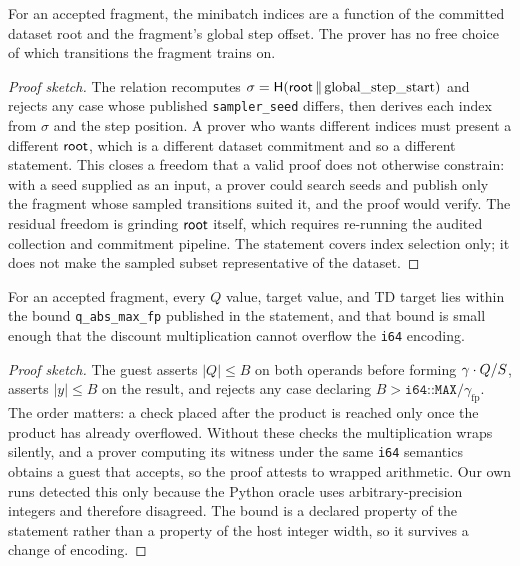 \begin{theorem}
\label{thm:sampler-binding}
For an accepted fragment, the minibatch indices are a function of the committed
dataset root and the fragment's global step offset. The prover has no free
choice of which transitions the fragment trains on.
\end{theorem}
\begin{proof}[Proof sketch]
The relation recomputes
$\sigma = \mathsf{H}(\mathsf{root} \,\|\, \mathrm{global\_step\_start})$ and rejects any
case whose published \texttt{sampler\_seed} differs, then derives each index
from $\sigma$ and the step position.  A prover who wants different indices must
present a different $\mathsf{root}$, which is a different dataset commitment and so a
different statement.  This closes a freedom that a valid proof does not
otherwise constrain: with a seed supplied as an input, a prover could search
seeds and publish only the fragment whose sampled transitions suited it, and
the proof would verify.  The residual freedom is grinding $\mathsf{root}$ itself, which
requires re-running the audited collection and commitment pipeline.  The
statement covers index selection only; it does not make the sampled subset
representative of the dataset.
\end{proof}

\begin{theorem}
\label{thm:value-bound}
For an accepted fragment, every $Q$ value, target value, and TD target lies
within the bound \texttt{q\_abs\_max\_fp} published in the statement, and that
bound is small enough that the discount multiplication cannot overflow the
\texttt{i64} encoding.
\end{theorem}
\begin{proof}[Proof sketch]
The guest asserts $|Q| \le B$ on both operands before forming
$\gamma \cdot Q / S$, asserts $|y| \le B$ on the result, and rejects any
case declaring $B > \texttt{i64::MAX} / \gamma_{\mathrm{fp}}$.  The order matters: a check
placed after the product is reached only once the product has already
overflowed.  Without these checks the multiplication wraps silently, and a
prover computing its witness under the same \texttt{i64} semantics obtains a
guest that accepts, so the proof attests to wrapped arithmetic.  Our own runs
detected this only because the Python oracle uses arbitrary-precision integers
and therefore disagreed.  The bound is a declared property of the statement
rather than a property of the host integer width, so it survives a change of
encoding.
\end{proof}


